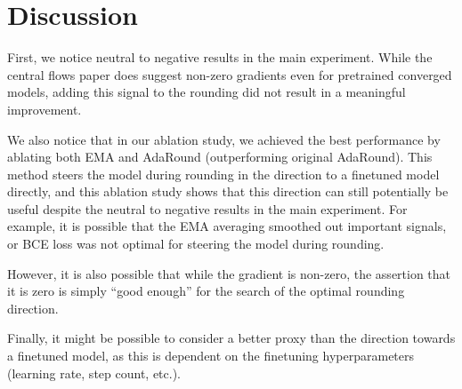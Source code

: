 \documentclass[../main.tex]{subfiles}
\begin{document}
\section{Discussion}
First, we notice neutral to negative results in the main experiment. While the central flows paper does suggest non-zero gradients even for pretrained converged models, adding this signal to the rounding did not result in a meaningful improvement.

We also notice that in our ablation study, we achieved the best performance by ablating both EMA and AdaRound (outperforming original AdaRound). This method steers the model during rounding in the direction to a finetuned model directly, and this ablation study shows that this direction can still potentially be useful despite the neutral to negative results in the main experiment. For example, it is possible that the EMA averaging smoothed out important signals, or BCE loss was not optimal for steering the model during rounding.

However, it is also possible that while the gradient is non-zero, the assertion that it is zero is simply ``good enough'' for the search of the optimal rounding direction.

Finally, it might be possible to consider a better proxy than the direction towards a finetuned model, as this is dependent on the finetuning hyperparameters (learning rate, step count, etc.).
\end{document}
